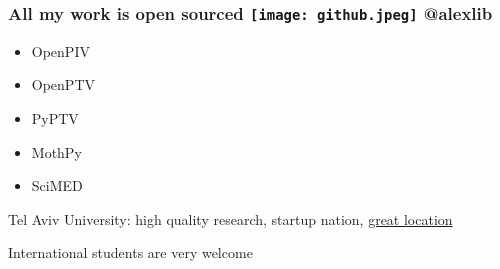 \begin{frame}[label=intro-2]
\frametitle{ All my work is open sourced \hfill \texttt{[image: github.jpeg]} @alexlib }
\begin{multicols}{2}
\begin{card}
\begin{itemize}
\item OpenPIV
\item OpenPTV
\item PyPTV
\item MothPy
\item SciMED
\end{itemize}
\end{card}
\end{multicols}
\end{frame}

\begin{frame}[label=intro-3]{Tel Aviv University: high quality research, startup nation, \href{https://www.youtube.com/watch?v=3SD_XlUyncw}{great location }}
\begin{multicols}{2}
\centering
{} 
\end{multicols}
\end{frame}


\begin{frame}[label=intro-4]{International students are very welcome}
\begin{columns}
\end{columns}
\end{frame}
